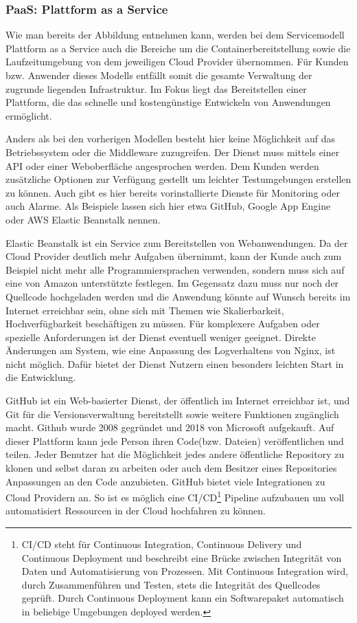    \subsubsection{PaaS: Plattform as a Service}
   Wie man bereits der Abbildung entnehmen kann, werden bei dem Servicemodell Plattform as a Service auch die Bereiche um die
   Containerbereitstellung sowie die Laufzeitumgebung von dem jeweiligen Cloud Provider übernommen. Für Kunden bzw. Anwender dieses Modells
   entfällt somit die gesamte Verwaltung der zugrunde liegenden Infrastruktur. Im Fokus liegt das Bereitstellen einer Plattform, die das
   schnelle und kostengünstige Entwickeln von Anwendungen ermöglicht.


   Anders als bei den vorherigen Modellen besteht hier keine Möglichkeit auf das Betriebssystem oder die Middleware zuzugreifen.
   Der Dienst muss mittels einer API oder einer Weboberfläche angesprochen werden.
   Dem Kunden werden zusätzliche Optionen zur Verfügung gestellt um leichter Testumgebungen erstellen zu können.
   Auch gibt es hier bereits vorinstallierte Dienste für Monitoring oder auch Alarme.
   Als Beispiele lassen sich hier etwa GitHub, Google App Engine oder AWS Elastic Beanstalk nennen.


   Elastic Beanstalk ist ein Service zum Bereitstellen von Webanwendungen. Da der Cloud Provider deutlich mehr Aufgaben übernimmt, kann der Kunde
   auch zum Beispiel nicht mehr alle Programmiersprachen verwenden, sondern muss sich auf eine von Amazon unterstützte festlegen.
   Im Gegensatz dazu muss nur noch der Quellcode hochgeladen werden und die Anwendung könnte auf Wunsch bereits im Internet erreichbar sein, ohne sich mit Themen
   wie Skalierbarkeit, Hochverfügbarkeit beschäftigen zu müssen. Für komplexere Aufgaben oder spezielle Anforderungen ist der Dienst eventuell weniger geeignet.
   Direkte Änderungen am System, wie eine Anpassung des Logverhaltens von Nginx, ist nicht möglich.
   Dafür bietet der Dienst Nutzern einen besonders leichten Start in die Entwicklung.

   GitHub ist ein Web-basierter Dienst, der öffentlich im Internet erreichbar ist, und Git für die Versionsverwaltung bereitstellt sowie weitere Funktionen zugänglich macht.
   Github wurde 2008 gegründet und 2018 von Microsoft aufgekauft. Auf dieser Plattform kann jede Person ihren Code(bzw. Dateien) veröffentlichen und teilen.
   Jeder Benutzer hat die Möglichkeit jedes andere öffentliche Repository zu klonen und selbst daran zu arbeiten oder auch dem Besitzer eines Repositories
   Anpassungen an den Code anzubieten. GitHub bietet viele Integrationen zu Cloud Providern an. So ist es möglich eine CI/CD\footnote{CI/CD steht für
   Continuous Integration, Continuous Delivery und Continuous Deployment und beschreibt eine Brücke zwischen Integrität von Daten und Automatisierung von Prozessen.
   Mit Continuous Integration wird, durch Zusammenführen und Testen, stets die Integrität des Quellcodes geprüft.
   Durch Continuous Deployment kann ein Softwarepaket automatisch in beliebige Umgebungen deployed werden. } Pipeline aufzubauen um voll automatisiert Ressourcen in der Cloud hochfahren zu können. \cite[]{GitHub}


